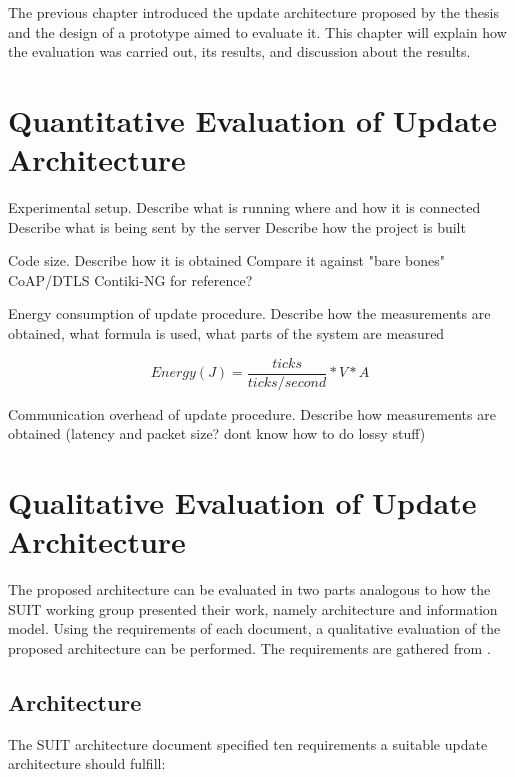 \documentclass[0-thesis.tex]{subfiles}
\begin{document}
The previous chapter introduced the update architecture proposed by the thesis and the
design of a prototype aimed to evaluate it. This chapter will explain how the evaluation
was carried out, its results, and discussion about the results.

\section{Quantitative Evaluation of Update Architecture}
\label{sec:quant-evaluation}

Experimental setup.
Describe what is running where and how it is connected
Describe what is being sent by the server
Describe how the project is built

Code size.
Describe how it is obtained
Compare it against "bare bones" CoAP/DTLS Contiki-NG for reference?

Energy consumption of update procedure.
Describe how the measurements are obtained, what formula is used, what parts of the system
are measured

$$ Energy (J) = \frac{ticks}{ticks/second} * V * A $$

Communication overhead of update procedure.
Describe how measurements are obtained (latency and packet size? dont know how to do lossy
stuff)

\section{Qualitative Evaluation of Update Architecture}
\label{sec:qual-evaluation}
The proposed architecture can be evaluated in two parts analogous to how the SUIT working
group presented their work, namely architecture and information model. Using the
requirements of each document, a qualitative evaluation of the proposed architecture can
be performed. The requirements are gathered from \parencite{suit-architecture,
suit-information-model}.
\subsection{Architecture}
\label{ssec:arch-evaluation}
The SUIT architecture document specified ten requirements a suitable update architecture
should fulfill:
\end{document}
